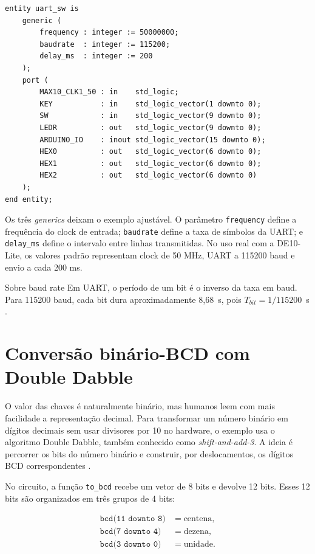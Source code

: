 \documentclass[12pt,a4paper]{book}
\begin{document}
\begin{lstlisting}[caption={Interface principal do exemplo uart\_sw.}]
entity uart_sw is
    generic (
        frequency : integer := 50000000;
        baudrate  : integer := 115200;
        delay_ms  : integer := 200
    );
    port (
        MAX10_CLK1_50 : in    std_logic;
        KEY           : in    std_logic_vector(1 downto 0);
        SW            : in    std_logic_vector(9 downto 0);
        LEDR          : out   std_logic_vector(9 downto 0);
        ARDUINO_IO    : inout std_logic_vector(15 downto 0);
        HEX0          : out   std_logic_vector(6 downto 0);
        HEX1          : out   std_logic_vector(6 downto 0);
        HEX2          : out   std_logic_vector(6 downto 0)
    );
end entity;
\end{lstlisting}

Os três \textit{generics} deixam o exemplo ajustável. O parâmetro \texttt{frequency} define a frequência do clock de entrada; \texttt{baudrate} define a taxa de símbolos da UART; e \texttt{delay\_ms} define o intervalo entre linhas transmitidas. No uso real com a DE10-Lite, os valores padrão representam clock de 50 MHz, UART a 115200 baud e envio a cada 200 ms.

\begin{observacao}{Sobre baud rate}
Em UART, o período de um bit é o inverso da taxa em baud. Para 115200 baud, cada bit dura aproximadamente 8{,}68~\textmu s, pois \(T_{bit}=1/115200\)~s \cite{mbedded_uart}.
\end{observacao}

\section{Conversão binário-BCD com Double Dabble}

O valor das chaves é naturalmente binário, mas humanos leem com mais facilidade a representação decimal. Para transformar um número binário em dígitos decimais sem usar divisores por 10 no hardware, o exemplo usa o algoritmo Double Dabble, também conhecido como \textit{shift-and-add-3}. A ideia é percorrer os bits do número binário e construir, por deslocamentos, os dígitos BCD correspondentes \cite{double_dabble_wiki}.

No circuito, a função \texttt{to\_bcd} recebe um vetor de 8 bits e devolve 12 bits. Esses 12 bits são organizados em três grupos de 4 bits:

\begin{align*}
\texttt{bcd(11 downto 8)} &= \text{centena},\\
\texttt{bcd(7 downto 4)}  &= \text{dezena},\\
\texttt{bcd(3 downto 0)}  &= \text{unidade}.
\end{align*}
\end{document}
